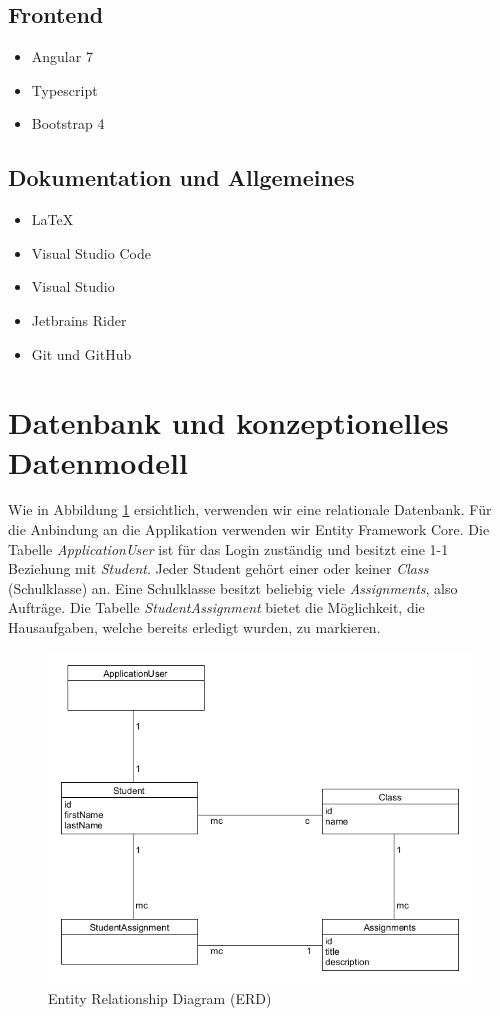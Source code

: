 \documentclass[a4paper, titlepage]{article}
\begin{document}
    \subsection{Frontend}
    \begin{itemize}
    \item Angular 7 \cite{Angular}
    \item Typescript \cite{TypeScript}
    \item Bootstrap 4 \cite{Bootstrap}
    \end{itemize}
    \subsection{Dokumentation und Allgemeines}
    \begin{itemize}
        \item \LaTeX{} \cite{LaTeX}
        \item Visual Studio Code \cite{VSCode}
        \item Visual Studio \cite{VS}
        \item Jetbrains Rider \cite{Rider}
        \item Git und GitHub \cite{GitHub}
    \end{itemize}

    \section{Datenbank und konzeptionelles Datenmodell}
    Wie in Abbildung \ref{erd} ersichtlich, verwenden wir eine relationale Datenbank. Für die Anbindung an die Applikation
    verwenden wir Entity Framework Core. Die Tabelle \emph{ApplicationUser}
    ist für das Login zuständig und besitzt eine 1-1 Beziehung mit \emph{Student}.
    Jeder Student gehört einer oder keiner \emph{Class} (Schulklasse) an. Eine Schulklasse besitzt
    beliebig viele \emph{Assignments}, also Aufträge. Die Tabelle \emph{StudentAssignment}
    bietet die Möglichkeit, die Hausaufgaben, welche bereits erledigt wurden,
    zu markieren.
    \begin{figure}
        \includegraphics[width=\textwidth]{uml}
        \caption{Entity Relationship Diagram (ERD)}
        \label{erd}
    \end{figure}
\end{document}
